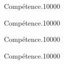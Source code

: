\begin{pageParcourst}
 
\end{pageParcourst} %


\begin{pageAuto} %

\begin{ExoAutoN}{Compétence.}{1}{0}{0}{0}{0}

\end{ExoAutoN}

\begin{ExoAutoN}{Compétence.}{1}{0}{0}{0}{0}

\end{ExoAutoN}


\begin{ExoAutoN}{Compétence.}{1}{0}{0}{0}{0}

\end{ExoAutoN}


\begin{ExoAutoN}{Compétence.}{1}{0}{0}{0}{0}

\end{ExoAutoN}

\end{pageAuto} %




\begin{pageBrouillon}

\end{pageBrouillon}


